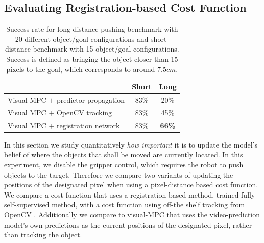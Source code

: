 \subsection{Evaluating Registration-based Cost Function}
\label{susbsec:reg_cost_exp}

\begin{table}
	{\footnotesize
		\begin{center}
			\begin{tabular}{lcc}
				\toprule
				& Short & Long \\
				\midrule
				Visual MPC $+$ predictor propagation  & 83\% & 20\% \\
				Visual MPC $+$ OpenCV tracking  & 83\%  & 45\% \\
				Visual MPC $+$ registration network & 83\% & \textbf{66\%}  \\
				\bottomrule
			\end{tabular}
		\end{center}
	}
	\caption{\small Success rate for long-distance pushing benchmark with 20 different object/goal configurations and short-distance benchmark with 15 object/goal configurations. Success is defined as bringing the object closer than 15 pixels to the goal, which corresponds to around $7.5cm$.}
	\label{table:res_long_short}
\end{table}


In this section we study quantitatively \emph{how important} it is to update the model's belief of where the objects that shall be moved are currently located. In this experiment, we disable the gripper control, which requires the robot to push objects to the target.
Therefore we compare two variants of updating the positions of the designated pixel when using a pixel-distance based cost function. We compare a cost function that uses a registration-based method, trained fully-self-supervised method, with a cost function using off-the shelf tracking from OpenCV \cite{babenko2009visual}. Additionally we compare to visual-MPC that uses the video-prediction model's own predictions as the current positions of the designated pixel, rather than tracking the object.


